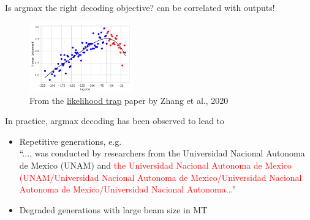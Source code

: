 \documentclass[usenames,dvipsnames,notes,11pt,aspectratio=169,hyperref={colorlinks=true, linkcolor=blue}]{beamer}
\begin{document}
\begin{frame}
    {Is argmax the right decoding objective?}
     can be correlated with  outputs!
    \vspace{-1em}
    \begin{figure}
        \includegraphics[height=3cm]{figures/likelihood-trap}
        \caption{From the \href{https://arxiv.org/abs/2004.10450}{likelihood trap} paper by Zhang et al., 2020}
    \end{figure}
    \vspace{-2em}

    In practice, argmax decoding has been observed to lead to\\
    \begin{itemize}
        \item Repetitive generations, e.g.\\
            {\footnotesize
                ``..., was conducted by researchers from the Universidad Nacional Autonoma de Mexico (UNAM) and \textcolor{red}{the Universidad Nacional Autonoma de Mexico (UNAM/Universidad Nacional Autonoma de Mexico/Universidad Nacional Autonoma de Mexico/Universidad Nacional Autonoma...}''}
        \item Degraded generations with large beam size in MT
    \end{itemize}
\end{frame}
\end{document}
